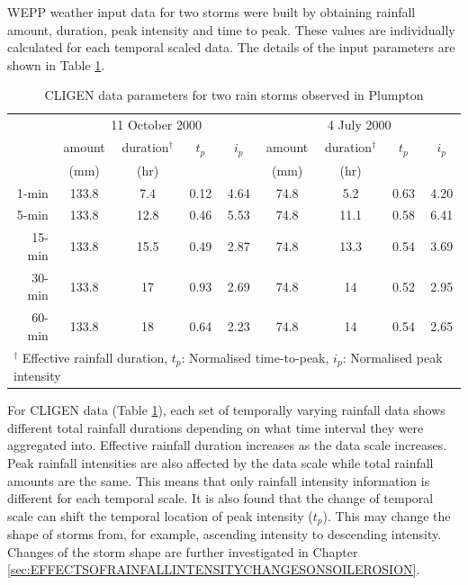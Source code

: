 WEPP weather input data for two storms were built by obtaining rainfall amount,
duration, peak intensity and time to peak. These values are individually
calculated for each temporal scaled data. The details of the input parameters
are shown in Table \ref{tab:CLIGENWEPPInputFileParameters}.

\begin{table}[htbp]
  \centering
  \small
  \caption{CLIGEN data parameters for two rain storms observed in
Plumpton}
  \label{tab:CLIGENWEPPInputFileParameters}
    \begin{tabular}{rcccccccc} \toprule
       & \multicolumn{4}{c}{11 October 2000} &
\multicolumn{4}{c}{4 July 2000}\\
       \cmidrule(r){2-5} \cmidrule(l){6-9}
       & amount & duration$^{\dagger}$ & $t_p$ & $i_p$ & amount &
duration$^{\dagger}$ & $t_p$ & $i_p$\\
       & \scriptsize(mm) & \scriptsize(hr) & & & \scriptsize(mm) &
\scriptsize(hr) & & \\
       \midrule
      1-min  & 133.8 & 7.4  & 0.12 & 4.64 & 74.8 & 5.2  & 0.63 & 4.20\\
      5-min  & 133.8 & 12.8 & 0.46 & 5.53 & 74.8 & 11.1 & 0.58 & 6.41\\
      15-min & 133.8 & 15.5 & 0.49 & 2.87 & 74.8 & 13.3 & 0.54 & 3.69\\
      30-min & 133.8 & 17   & 0.93 & 2.69 & 74.8 & 14   & 0.52 & 2.95\\
      60-min & 133.8 & 18   & 0.64 & 2.23 & 74.8 & 14   & 0.54 & 2.65\\
      \bottomrule
      \multicolumn{9}{l}{\footnotesize $^\dagger$ Effective rainfall
duration, {\normalsize{$t_p$}}: Normalised time-to-peak, {\normalsize{$i_p$}}:
Normalised peak intensity}
    \end{tabular}
\end{table}

For CLIGEN data (Table \ref{tab:CLIGENWEPPInputFileParameters}), each set of
temporally varying rainfall data shows different total rainfall durations
depending on what time interval they were aggregated into. Effective rainfall
duration increases as the data scale increases. Peak rainfall intensities are
also affected by the data scale while total rainfall amounts are the same. This
means that only rainfall intensity information is different for each temporal
scale. It is also found that the change of temporal scale can shift the temporal
location of peak intensity ($t_p$). This may change the shape of storms from,
for example, ascending intensity to descending intensity. Changes of the storm
shape are further investigated in Chapter
\ref{sec:EFFECTSOFRAINFALLINTENSITYCHANGESONSOILEROSION}.

